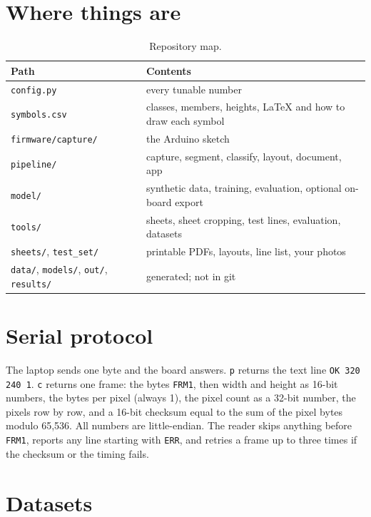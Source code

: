 \documentclass[11pt]{article}
\newcommand{\cmd}[1]{\texttt{#1}}
\begin{document}
\section{Where things are}

\begin{table}[H]
\centering
\begin{tabular}{C{3.6cm}C{7.8cm}}
\toprule
\textbf{Path} & \textbf{Contents} \\
\midrule
\cmd{config.py} & every tunable number \\
\cmd{symbols.csv} & classes, members, heights, \LaTeX{} and how to draw each symbol \\
\cmd{firmware/capture/} & the Arduino sketch \\
\cmd{pipeline/} & capture, segment, classify, layout, document, app \\
\cmd{model/} & synthetic data, training, evaluation, optional on-board export \\
\cmd{tools/} & sheets, sheet cropping, test lines, evaluation, datasets \\
\cmd{sheets/}, \cmd{test\_set/} & printable PDFs, layouts, line list, your photos \\
\cmd{data/}, \cmd{models/}, \cmd{out/}, \cmd{results/} & generated; not in git \\
\bottomrule
\end{tabular}
\caption{Repository map.}
\end{table}

\appendix

\section{Serial protocol}

The laptop sends one byte and the board answers. \cmd{p} returns the text line
\cmd{OK 320 240 1}. \cmd{c} returns one frame: the bytes \cmd{FRM1}, then width and height as
16-bit numbers, the bytes per pixel (always 1), the pixel count as a 32-bit number, the pixels row
by row, and a 16-bit checksum equal to the sum of the pixel bytes modulo 65{,}536. All numbers are
little-endian. The reader skips anything before \cmd{FRM1}, reports any line starting with
\cmd{ERR}, and retries a frame up to three times if the checksum or the timing fails.

\section{Datasets}
\label{app:data}
\end{document}
